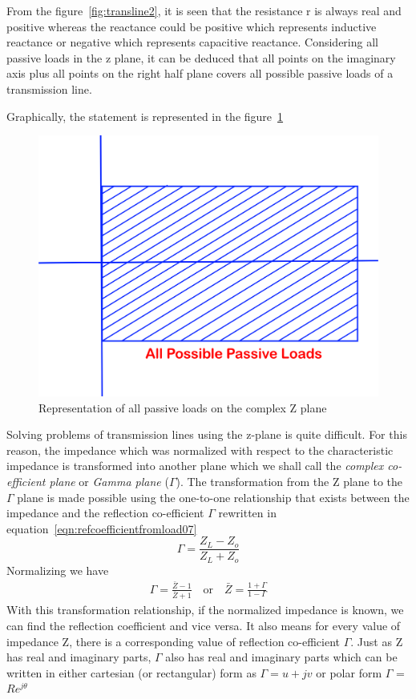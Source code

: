From the figure~\ref{fig:transline2}, it is seen that the resistance r is always real and positive whereas the reactance could be positive which represents inductive reactance or negative which represents capacitive reactance. Considering all passive loads in the z plane, it can be deduced that all points on the imaginary axis plus all points on the right half plane covers all possible passive loads of a transmission line.

Graphically, the statement is represented in the figure~\ref{fig:oigvbnkliu}
\begin{figure}[h]
\centering
\includegraphics[width=0.6\linewidth]{./graphics/oigvbnkliu}
\caption{Representation of all passive loads on the complex Z plane}
\label{fig:oigvbnkliu}
\end{figure}

Solving problems of transmission lines using the z-plane is quite difficult. For this reason, the impedance which was normalized with respect to the characteristic impedance is transformed into another plane which we shall call the \emph{complex co-efficient plane} or \emph{Gamma plane} ($\Gamma$).
The transformation from the Z plane to the $\Gamma$ plane is made possible using the one-to-one relationship that exists between the impedance and the reflection co-efficient $\Gamma$ rewritten in equation~\ref{eqn:refcoefficientfromload07}
\begin{equation}
\Gamma = \frac{Z_L - Z_o}{Z_L + Z_o}\label{eqn:refcoefficientfromload07}
\end{equation}
Normalizing we have
\begin{align*}
\Gamma= \frac{\bar{Z} - 1}{\bar{Z} + 1}\quad\text{or}\quad\bar{Z}= \frac{1 + \Gamma}{1 - \Gamma}
\end{align*}
With this transformation relationship, if the normalized impedance is known, we can find the reflection coefficient and vice versa. It also means for every value of impedance Z, there is a corresponding value of reflection co-efficient $ \Gamma$. Just as Z has real and imaginary parts, $\Gamma$ also has real and imaginary parts which can be written in either cartesian (or rectangular) form as $\Gamma=u+jv$ or polar form $\Gamma$ = $Re^{j\theta}$

